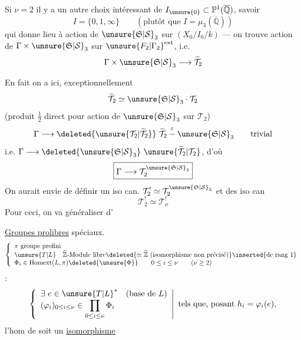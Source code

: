 Si $\nu=2$ il y a un autre choix
intéressant de $I_{\unsure{0}}\subset\mathbb P^1(\overline{\mathbb Q})$, savoir
\[
I=\{0,1,\infty\}\qquad(\text{plutôt que }I=\mu_3(\overline{\mathbb Q}))
\]
qui donne lieu à action de
$\unsure{\mathfrak S|\mathcal S}_3$ sur $(X_0/I_0/k)$ --- on trouve
action de $\Gamma\times\unsure{\mathfrak S|\mathcal S}_3$ sur $\unsure{F_2|\Gamma_2}^{\mathrm{ext}}$, i.e.
\[
\Gamma\times\unsure{\mathfrak S|\mathcal S}_3\longrightarrow\widetilde{\mathcal T}_2
\]

En fait on a ici, exceptionnellement
\[
\widetilde{\mathcal T}_2\simeq\unsure{\mathfrak S|\mathcal S}_3\cdot\mathcal T_2
\]
(produit $\tfrac12$ direct pour action de $\unsure{\mathfrak S|\mathcal S}_3$ sur $\mathcal T_2$)
\[
\Gamma\longrightarrow\deleted{\unsure{\mathcal T_2|\widetilde{\mathcal T}_2}}\ \widetilde{\mathcal T}_2
\overset{\varepsilon}{-}\unsure{\mathfrak S|\mathcal S}_3\qquad\text{trivial}
\]
i.e. $\Gamma\longrightarrow\deleted{\unsure{\mathfrak S|\mathcal S}_3}\ \unsure{\widetilde{\mathcal T}_2|\mathcal T_2}$, d'où
\[
\boxed{\Gamma\longrightarrow\mathcal T_2^{\unsure{\mathfrak S|\mathcal S}_3}}
\]
On aurait envie de définir un
iso can. $\mathcal T_2^!\simeq\mathcal T_2^{\unsure{\mathfrak S|\mathcal S}_3}$
et des iso can
\[
\mathcal T_2^!\simeq\mathcal T_\nu^!
\]
Pour ceci, on va généraliser d'

\uline{Groupes prolibres} spéciaux.
\[
\left\{\begin{array}{l}
\pi\ \text{groupe profini}\\
\unsure{T|L}\quad\widehat{\mathbb Z}\text{-Module libre}
\deleted{\simeq\widehat{\mathbb Z}\text{ (isomorphisme non précisé)}}\inserted{\text{de rang }1}\\
\Phi_i\in\operatorname{Homext}(L,\pi)\deleted{\unsure{\Phi}}
\qquad0\leq i\leq\nu\qquad(\nu\geq2)
\end{array}\right.
\]
 :
\[
\left\{\begin{array}{l}
\exists\ e\in\unsure{T|L}^*\quad(\text{base de }L)\\
(\varphi_i)_{0\leq i\leq\nu}\in\displaystyle\prod_{0\leq i\leq\nu}\Phi_i
\end{array}\right|\ \text{tels que, posant }h_i=\varphi_i(e),
\]
l'hom de
soit un \uline{isomorphisme}

